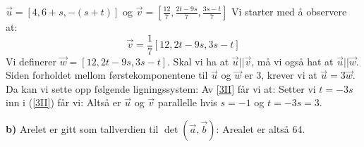 $\vec{u}=[4, 6+s, -(s+t)] $ og $ \vec{v}=\left[\frac{12}{7}, \frac{2t-9s}{7}, \frac{3s-t}{7}\right] $
Vi starter med å observere at:
\[ \vec{v}=\frac{1}{7}[12, 2t-9s, 3s-t] \]
Vi definerer $ \vec{w}= [12, 2t-9s, 3s-t] $. Skal vi ha at $ \vec{u}||\vec{v} $, må vi også hat at $ \vec{u}||\vec{w} $. Siden forholdet mellom førstekomponentene til $ \vec{u} $ og $ \vec{w} $ er 3, krever vi at $ \vec{u}=3\vec{w} $. Da kan vi sette opp følgende ligningssystem:
Av \ref{3II} får vi at:
Setter vi $ t=-3s $ inn i (\ref{3II}) får vi:
Altså er $ \vec{u} $ og $ \vec{v} $ parallelle hvis $ s=-1 $ og $ t=-3s=3 $. 



\textbf{b)} Arelet er gitt som tallverdien til $ \det(\vec{a}, \vec{b}) $:
Arealet er altså 64.


